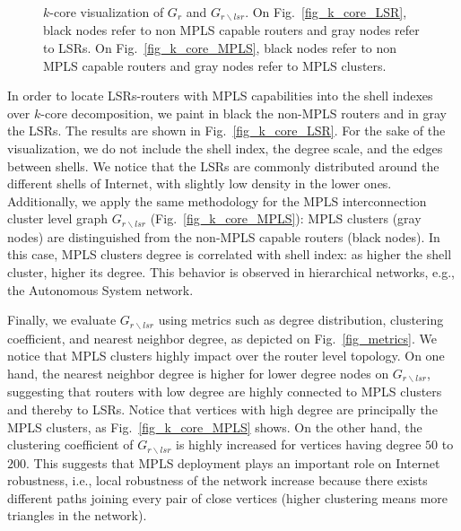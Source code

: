 \begin{figure*}[!t]
  \begin{center}
\hfil
  \end{center}
\vspace{-0.5cm}  
  \caption{$k$-core visualization of $G_r$ and $G_{r \backslash lsr}$.  On
  Fig.~\ref{fig_k_core_LSR}, black nodes refer to non MPLS capable routers and
  gray nodes refer to LSRs.  On Fig.~\ref{fig_k_core_MPLS}, black nodes refer to
  non MPLS capable routers and gray nodes refer to MPLS clusters.} 
  \label{fig_kcore_overview}
\end{figure*}

In order to locate LSRs-routers with MPLS capabilities into the shell indexes
over $k$-core decomposition, we paint in black the non-MPLS routers and in gray
the LSRs. The results are shown in Fig.~\ref{fig_k_core_LSR}.  For the sake of
the visualization, we do not include the shell index, the degree scale, and the
edges between shells. We notice that the LSRs are commonly distributed around
the different shells of Internet, with slightly low density in the lower ones.
Additionally, we apply the same methodology for the MPLS interconnection cluster
level graph $G_{r\backslash lsr}$ (Fig.~\ref{fig_k_core_MPLS}): MPLS clusters
(gray nodes) are distinguished from the non-MPLS capable routers (black nodes).
In this case,  MPLS clusters  degree is correlated with shell index: as higher
the shell cluster, higher its degree. This behavior is observed in hierarchical
networks, e.g., the Autonomous System network.

Finally, we evaluate $G_{r \backslash lsr }$ using metrics such as degree
distribution, clustering coefficient, and nearest neighbor degree, as depicted
on Fig.~\ref{fig_metrics}. We notice that MPLS clusters highly impact over the
router level topology. On one hand, the nearest neighbor degree is higher for
lower degree nodes on $G_{r \backslash lsr}$, suggesting that routers with low
degree are highly connected to MPLS clusters and thereby to LSRs. Notice that
vertices with high degree are principally the MPLS clusters, as
Fig.~\ref{fig_k_core_MPLS} shows. On the other hand, the clustering coefficient
of $G_{r \backslash lsr }$ is highly increased for vertices having degree $50$
to $200$. This suggests that MPLS deployment plays an important role on
Internet robustness, i.e., local robustness of the network increase because
there exists different paths joining every pair of close vertices (higher
clustering means more triangles in the network).

